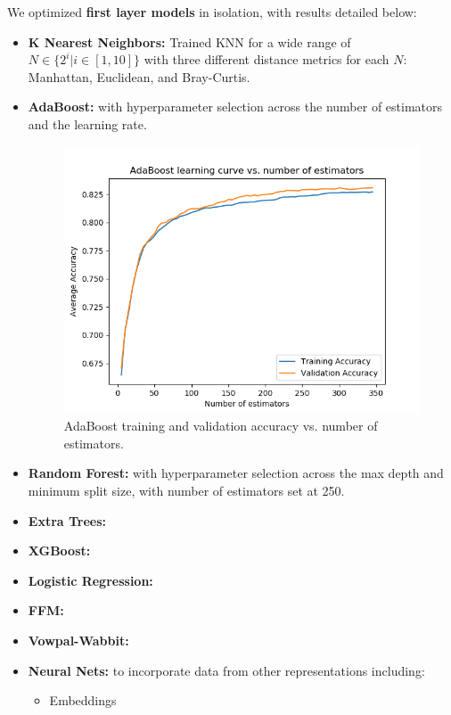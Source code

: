 \begin{itemize}
        We optimized \textbf{first layer models} in isolation, with results detailed below:
        \begin{itemize}
            \item \textbf{K Nearest Neighbors:} Trained KNN for a wide range of $N \in \{2^i | i \in [1,10]\}$ with three different distance metrics for each $N$: Manhattan, Euclidean, and Bray-Curtis.
            \item \textbf{AdaBoost:} with hyperparameter selection across the number of estimators and the learning rate.
                \begin{figure}[H]
                \centering
                \includegraphics[width=\textwidth]{adaboost_vs_nest.png}
                \caption{AdaBoost training and validation accuracy vs. number of estimators.}
                \end{figure}
            \item \textbf{Random Forest:} with hyperparameter selection across the max depth and minimum split size, with number of estimators set at 250.
            \item \textbf{Extra Trees:} %
            \item \textbf{XGBoost:} %
            \item \textbf{Logistic Regression:} %
            \item \textbf{FFM:} %
            \item \textbf{Vowpal-Wabbit:} %
            \item \textbf{Neural Nets:} to incorporate data from other representations including:
                \begin{itemize}
                    \item Embeddings %
                \end{itemize}
        \end{itemize}


\end{itemize}
